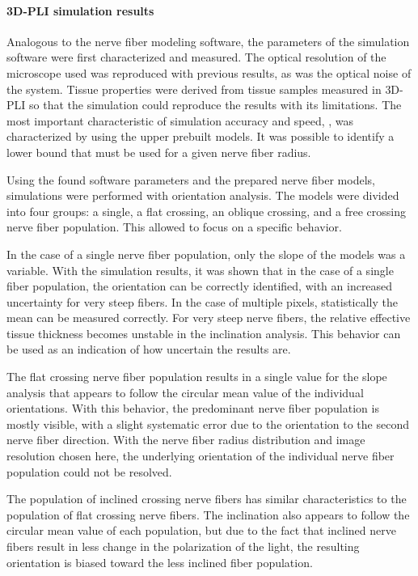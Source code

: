 \paragraph{\acs{3D-PLI} simulation results}
% 
Analogous to the nerve fiber modeling software, the parameters of the simulation software were first characterized and measured.
The optical resolution of the microscope used was reproduced with previous results, as was the optical noise of the system.
Tissue properties were derived from tissue samples measured in \ac{3D-PLI} so that the simulation could reproduce the results with its limitations.
The most important characteristic of simulation accuracy and speed, \Voxelsize{}, was characterized by using the upper prebuilt models.
It was possible to identify a lower bound that must be used for a given nerve fiber radius.
\par
% 
Using the found software parameters and the prepared nerve fiber models, simulations were performed with orientation analysis.
The models were divided into four groups: a single, a flat crossing, an oblique crossing, and a free crossing nerve fiber population.
This allowed to focus on a specific behavior.
\par
% 
In the case of a single nerve fiber population, only the slope of the models was a variable.
With the simulation results, it was shown that in the case of a single fiber population, the orientation can be correctly identified, with an increased uncertainty for very steep fibers.
In the case of multiple pixels, statistically the mean can be measured correctly.
For very steep nerve fibers, the relative effective tissue thickness becomes unstable in the inclination analysis.
This behavior can be used as an indication of how uncertain the results are.
\par
% 
The flat crossing nerve fiber population results in a single value for the slope analysis that appears to follow the circular mean value of the individual orientations.
With this behavior, the predominant nerve fiber population is mostly visible, with a slight systematic error due to the orientation to the second nerve fiber direction.
With the nerve fiber radius distribution and image resolution chosen here, the underlying orientation of the individual nerve fiber population could not be resolved.
\par
% 
The population of inclined crossing nerve fibers has similar characteristics to the population of flat crossing nerve fibers.
The inclination also appears to follow the circular mean value of each population, but due to the fact that inclined nerve fibers result in less change in the polarization of the light, the resulting orientation is biased toward the less inclined fiber population.
